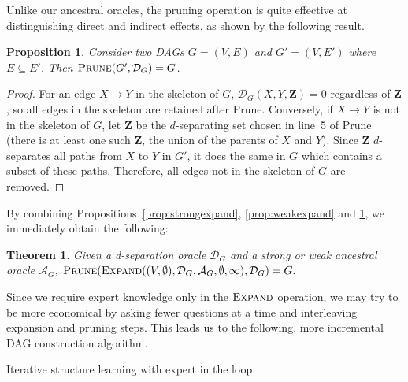 \documentclass{uai2025} %
\newtheorem{proposition}{Proposition}
\newtheorem{theorem}{Theorem}
\begin{document}
Unlike our ancestral oracles, the pruning operation is quite effective at distinguishing
direct and indirect effects, as shown by the following result.

\begin{proposition}
Consider two DAGs $G=(V,E)$ and $G'=(V,E')$ where $E \subseteq E'$. 
Then $\textsc{Prune}(G',\mathcal{D}_G)=G$.
\label{prop:prune}
\end{proposition}

\begin{proof}
For an edge $X \to Y$ in the skeleton of $G$, $\mathcal{D}_G(X, Y, \mathbf{Z}) = 0$ regardless 
of $\mathbf{Z}$, so all edges in the skeleton are retained after {\sc Prune}. Conversely, if 
 $X \to Y$ is not in the skeleton of $G$, let $\mathbf{Z}$ be the $d$-separating set chosen 
in line~5 of {\sc Prune} (there is at least one such $\mathbf{Z}$, the union of the parents of 
$X$ and $Y$). Since  $\mathbf{Z}$ $d$-separates all paths from $X$ to $Y$ in $G'$, it does the same 
in $G$ which contains a subset of these paths. Therefore, all edges not in the skeleton of $G$ are 
removed.
\end{proof}

By combining Propositions~\ref{prop:strongexpand}, \ref{prop:weakexpand} and 
\ref{prop:prune}, we immediately obtain the following:

\begin{theorem}
Given a d-separation oracle $\mathcal{D}_G$ and a strong or weak 
ancestral oracle $\mathcal{A}_G$, 
$\textsc{Prune}(\textsc{Expand}((V,\emptyset),\mathcal{D}_G,\mathcal{A}_G,\emptyset,\infty),\mathcal{D}_G)=G.$
\end{theorem}

Since we require expert knowledge only in the $\textsc{Expand}$ operation, we may try
to be more economical by asking fewer questions at a time and interleaving expansion and
pruning steps. This leads us to the following, more incremental DAG construction algorithm.

\begin{algorithm}[h]
\DontPrintSemicolon
\SetAlgoLined
{}


\caption{Iterative structure learning with expert in the loop}
\label{algo:expert}
\end{algorithm} 
\end{document}
